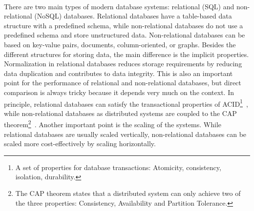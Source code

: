 ~\\
There are two main types of modern database systems: relational (SQL) and non-relational (NoSQL) databases. Relational databases have a table-based data structure with a predefined schema, while non-relational databases do not use a predefined schema and store unstructured data. Non-relational databases can be based on key-value pairs, documents, column-oriented, or graphs. Besides the different structures for storing data, the main difference is the implicit properties. Normalization in relational databases reduces storage requirements by reducing data duplication and contributes to data integrity. This is also an important point for the performance of relational and non-relational databases, but direct comparison is always tricky because it depends very much on the context. In principle, relational databases can satisfy the transactional properties of ACID\footnote{A set of properties for database transactions: Atomicity, consistency, isolation, durability.}~\cite{garcia-molina_database_2008}, while non-relational databases as distributed systems are coupled to the CAP theorem\footnote{The CAP theorem states that a distributed system can only achieve two of the three properties: Consistency, Availability and Partition Tolerance.}~\cite{sadalage_nosql_2012}. Another important point is the scaling of the systems. While relational databases are usually scaled vertically, non-relational databases can be scaled more cost-effectively by scaling horizontally. 

